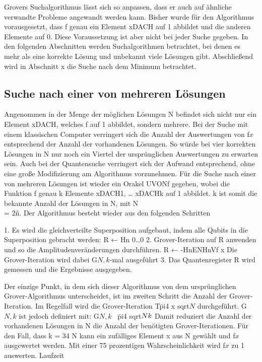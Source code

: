 Grovers Suchalgorithmus lässt sich so anpassen, dass er auch auf ähnliche verwandte Probleme angewandt werden kann. Bisher wurde für den Algorithmus vorausgesetzt, dass f genau ein Element xDACH auf 1 abbildet und die anderen Elemente auf 0. Diese Voraussetzung ist aber nicht bei jeder Suche gegeben. In den folgenden Abschnitten werden Suchalgorithmen betrachtet, bei denen es mehr als eine korrekte Lösung und unbekannt viele Lösungen gibt. Abschließend wird in Abschnitt x die Suche nach dem Minimum betrachtet. 

\subsection{Suche nach einer von mehreren Lösungen}

Angenommen in der Menge der möglichen Lösungen N befindet sich nicht nur ein Element xDACH, welches f auf 1 abbildet, sondern mehrere. Bei der Suche mit einem klassischen Computer verringert sich die Anzahl der Auswertungen von f\(x\) entsprechend der Anzahl der vorhandenen Lösungen. So würde bei vier korrekten Lösungen in N nur noch ein Viertel der ursprünglichen Auswertungen zu erwarten sein.
Auch bei der Quantensuche verringert sich der Aufwand entsprechend, ohne eine große Modifizierung am Algorithmus vorzunehmen.
Für die Suche nach einer von mehreren Lösungen ist wieder ein Orakel UVONf gegeben, wobei die Funktion f genau k Elemente xDACH1, … xDACHk auf 1 abbildet. k ist somit die bekannte Anzahl der Lösungen in N, mit N \\= 2\^n. Der Algorithmus besteht wieder aus den folgenden Schritten\:

1. Es wird die gleichverteilte Superposition aufgebaut, indem alle Qubits in die Superposition gebracht werden:
R ← Hn 0…0  
2. Grover-Iteration auf R anwenden und so die Amplitudenveränderungen durchführen. 
R ← -HnENHnVf x
Die Grover-Iteration wird dabei G\(N,k\)-mal ausgeführt
3. Das Quantenregister R wird gemessen und die Ergebnisse ausgegeben.

Der einzige Punkt, in dem sich dieser Algorithmus von dem ursprünglichen Grover-Algorithmus unterscheidet, ist im zweiten Schritt die Anzahl der Grover-Iteration. Im Regelfall wird die Grover-Iteration T\= pi\/4 x sqrt\(N\) durchgeführt. G\(N,k\) ist jedoch definiert mit:
G\(N,k\) ~\= pi\/4 sqrt\(N\/k\)
Damit reduziert die Anzahl der vorhandenen Lösungen in N die Anzahl der benötigten Grover-Iterationen. Für den Fall, dass k \>= 3\/4 N kann ein zufälliges Element x aus N gewählt und f\(x\) ausgewertet werden. Mit einer 75 prozentigen Wahrscheinlichkeit wird f\(x\) zu 1 auswerten.
Laufzeit


